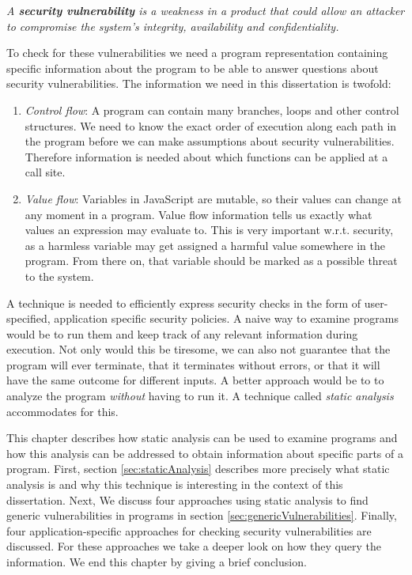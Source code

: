 \begin{definition}
\textit{A \textbf{security vulnerability} is a weakness in a product that could allow an attacker to compromise the system's integrity, availability and confidentiality.} 
\end{definition}

To check for these vulnerabilities we need a program representation containing specific information about the program to be able to answer questions about security vulnerabilities. The information we need in this dissertation is twofold:

\begin{enumerate}
\item \textit{Control flow}: A program can contain many branches, loops and other control structures. We need to know the exact order of execution along each path in the program before we can make assumptions about security vulnerabilities. Therefore information is needed about which functions can be applied at a call site.
\item \textit{Value flow}: Variables in JavaScript are mutable, so their values can change at any moment in a program. Value flow information tells us exactly what values an expression may evaluate to. This is very important w.r.t. security, as a harmless variable may get assigned a harmful value somewhere in the program. From there on, that variable should be marked as a possible threat to the system.
\end{enumerate}

A technique is needed to efficiently express security checks in the form of user-specified, application specific security policies. A naive way to examine programs would be to run them and keep track of any relevant information during execution. Not only would this be tiresome, we can also not guarantee that the program will ever terminate, that it terminates without errors, or that it will have the same outcome for different inputs. A better approach would be to to analyze the program \textit{without} having to run it. A technique called \textit{static analysis} accommodates for this.

This chapter describes how static analysis can be used to examine programs and how this analysis can be addressed to obtain information about specific parts of a program. First, section \ref{sec:staticAnalysis} describes more precisely what static analysis is and why this technique is interesting in the context of this dissertation. Next, We discuss four approaches using static analysis to find generic vulnerabilities in programs in section \ref{sec:genericVulnerabilities}. Finally, four application-specific approaches for checking security vulnerabilities are discussed. For these approaches we take a deeper look on how they query the information. We end this chapter by giving a brief conclusion.

